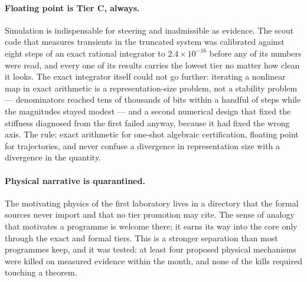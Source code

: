 \documentclass[11pt]{article}
\begin{document}
\paragraph{Floating point is Tier C, always.} Simulation is indispensable for steering and
inadmissible as evidence. The scout code that measures transients in the truncated system was
calibrated against eight steps of an exact rational integrator to $2.4\times10^{-16}$ before any
of its numbers were read, and every one of its results carries the lowest tier no matter how
clean it looks. The exact integrator itself could not go further: iterating a nonlinear map in
exact arithmetic is a representation-size problem, not a stability problem --- denominators
reached tens of thousands of bits within a handful of steps while the magnitudes stayed modest
--- and a second numerical design that fixed the stiffness diagnosed from the first failed anyway,
because it had fixed the wrong axis. The rule: exact arithmetic for one-shot algebraic
certification, floating point for trajectories, and never confuse a divergence in representation
size with a divergence in the quantity.

\paragraph{Physical narrative is quarantined.} The motivating physics of the first laboratory
lives in a directory that the formal sources never import and that no tier promotion may cite.
The sense of analogy that motivates a programme is welcome there; it earns its way into the core
only through the exact and formal tiers. This is a stronger separation than most programmes keep,
and it was tested: at least four proposed physical mechanisms were killed on measured
evidence within the month, and none of the kills required touching a theorem.
\end{document}
